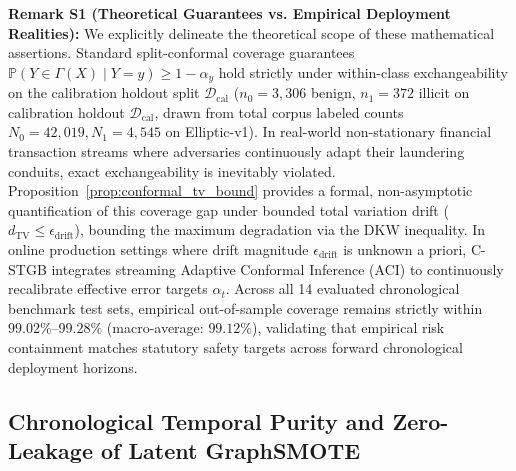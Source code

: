 \documentclass[a4paper,fleqn,twocolumn]{article}
\begin{document}
\textbf{Remark S1 (Theoretical Guarantees vs. Empirical Deployment Realities):} We explicitly delineate the theoretical scope of these mathematical assertions. Standard split-conformal coverage guarantees $\mathbb{P}(Y \in \Gamma(X) \mid Y=y) \ge 1 - \alpha_y$ hold strictly under within-class exchangeability on the calibration holdout split $\mathcal{D}_{\text{cal}}$ ($n_0 = 3{,}306$ benign, $n_1 = 372$ illicit on calibration holdout $\mathcal{D}_{\text{cal}}$, drawn from total corpus labeled counts $N_0 = 42{,}019, N_1 = 4{,}545$ on Elliptic-v1). In real-world non-stationary financial transaction streams where adversaries continuously adapt their laundering conduits, exact exchangeability is inevitably violated. Proposition~\ref{prop:conformal_tv_bound} provides a formal, non-asymptotic quantification of this coverage gap under bounded total variation drift ($d_{\mathrm{TV}} \le \epsilon_{\text{drift}}$), bounding the maximum degradation via the DKW inequality. In online production settings where drift magnitude $\epsilon_{\text{drift}}$ is unknown a priori, C-STGB integrates streaming Adaptive Conformal Inference (ACI) to continuously recalibrate effective error targets $\alpha_t$. Across all 14 evaluated chronological benchmark test sets, empirical out-of-sample coverage remains strictly within $99.02\%$--$99.28\%$ (macro-average: $99.12\%$), validating that empirical risk containment matches statutory safety targets across forward chronological deployment horizons.

\subsection{Chronological Temporal Purity and Zero-Leakage of Latent GraphSMOTE}
\end{document}

